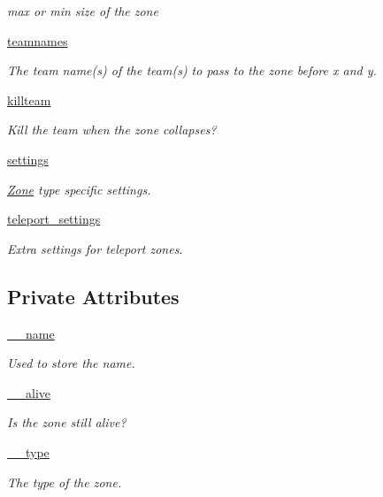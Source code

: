 \begin{DoxyCompactItemize}
\begin{DoxyCompactList}\small\item\em max or min size of the zone \item\end{DoxyCompactList}\item 
\hyperlink{class_zone_1_1_zone_a0f3f8429ae8a37672f700da3f2805a91}{teamnames}
\begin{DoxyCompactList}\small\item\em The team name(s) of the team(s) to pass to the zone before x and y. \item\end{DoxyCompactList}\item 
\hyperlink{class_zone_1_1_zone_a45db96faa826bf1e485c70da9c07d83e}{killteam}
\begin{DoxyCompactList}\small\item\em Kill the team when the zone collapses? \item\end{DoxyCompactList}\item 
\hyperlink{class_zone_1_1_zone_a57b65c53ff747cf9504c88ff37d7b9ee}{settings}
\begin{DoxyCompactList}\small\item\em \hyperlink{class_zone_1_1_zone}{Zone} type specific settings. \item\end{DoxyCompactList}\item 
\hyperlink{class_zone_1_1_zone_a2b9ae272876347626e25ead4d48f9a97}{teleport\_\-settings}
\begin{DoxyCompactList}\small\item\em Extra settings for teleport zones. \item\end{DoxyCompactList}\end{DoxyCompactItemize}
\subsection*{Private Attributes}
\begin{DoxyCompactItemize}
\item 
\hyperlink{class_zone_1_1_zone_a72ab1886c15120f42281d35955ab21b5}{\_\-\_\-name}
\begin{DoxyCompactList}\small\item\em Used to store the name. \item\end{DoxyCompactList}\item 
\hyperlink{class_zone_1_1_zone_a1c4e31d1327ad4d7a2c31a2b7fcde5e7}{\_\-\_\-alive}
\begin{DoxyCompactList}\small\item\em Is the zone still alive? \item\end{DoxyCompactList}\item 
\hyperlink{class_zone_1_1_zone_a5164f57edacb2b3a7b3dfca3ba949139}{\_\-\_\-type}
\begin{DoxyCompactList}\small\item\em The type of the zone. \item\end{DoxyCompactList}\end{DoxyCompactItemize}
